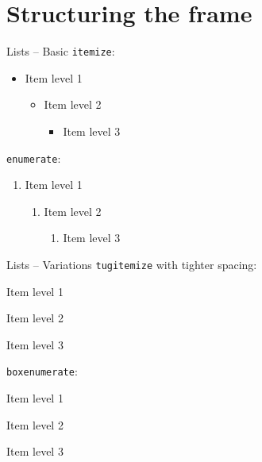 \documentclass[table, aspectratio=169]{beamer}
\begin{document}
\section{Structuring the frame}

\begin{frame}{Lists -- Basic}
  \texttt{itemize}:
  \begin{itemize}
    \item Item level 1
      \begin{itemize}
        \item Item level 2
          \begin{itemize}
            \item Item level 3
          \end{itemize}
      \end{itemize}
  \end{itemize}

  \texttt{enumerate}:
  \begin{enumerate}
    \item Item level 1
      \begin{enumerate}
        \item Item level 2
          \begin{enumerate}
            \item Item level 3
          \end{enumerate}
      \end{enumerate}
  \end{enumerate}
\end{frame}

\begin{frame}{Lists -- Variations}
  \texttt{tugitemize} with tighter spacing:
  \begin{tugitemize}
    \item Item level 1
      \begin{tugitemize}
        \item Item level 2
          \begin{tugitemize}
            \item Item level 3
          \end{tugitemize}
      \end{tugitemize}
  \end{tugitemize}

  \texttt{boxenumerate}:
  \begin{boxenumerate}
    \item Item level 1
      \begin{boxenumerate}
        \item Item level 2
          \begin{boxenumerate}
            \item Item level 3
          \end{boxenumerate}
      \end{boxenumerate}
  \end{boxenumerate}
\end{frame}
\end{document}
